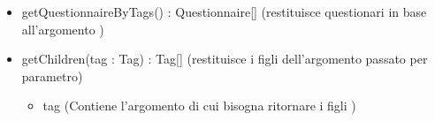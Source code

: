 \begin{description}
\begin{itemize}
\item getQuestionnaireByTags() : Questionnaire[] (restituisce questionari in base all'argomento )
\item getChildren(tag : Tag) : Tag[] (restituisce i figli dell'argomento passato per parametro)\begin{itemize}
\item tag (Contiene l'argomento di cui bisogna ritornare i figli )
\end{itemize}

\end{itemize}

\end{description}

\vspace{0.5cm}
\hypertarget{client::controller::student::ExecuteQuestionnaire}{}
